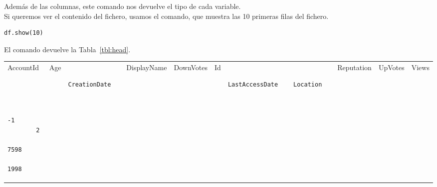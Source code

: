 \documentclass[12pt,a4paper,twoside,openright,titlepage,final]{article}
\begin{document}
Además de las columnas, este comando nos devuelve el tipo de cada variable.\\

Si queremos ver el contenido del fichero, usamos el comando, que muestra las 10 primeras filas del fichero.

\begin{verbatim}
df.show(10)
\end{verbatim}

El comando devuelve la Tabla~\ref{tbl:head}.\\

\begin{longtable}[]{@{}lllllllllll@{}}
	\toprule
	\begin{minipage}[t]{0.05\columnwidth}\raggedright\strut
		AccountId
		\strut\end{minipage} &
	\begin{minipage}[t]{0.03\columnwidth}\raggedright\strut
		Age
		\strut\end{minipage} &
	\begin{minipage}[t]{0.11\columnwidth}\raggedright\strut
		\begin{verbatim}
		CreationDate
		\end{verbatim}
		\strut\end{minipage} &
	\begin{minipage}[t]{0.08\columnwidth}\raggedright\strut
		DisplayName
		\strut\end{minipage} &
	\begin{minipage}[t]{0.05\columnwidth}\raggedright\strut
		DownVotes
		\strut\end{minipage} &
	\begin{minipage}[t]{0.02\columnwidth}\raggedright\strut
		Id
		\strut\end{minipage} &
	\begin{minipage}[t]{0.11\columnwidth}\raggedright\strut
		\begin{verbatim}
		LastAccessDate
		\end{verbatim}
		\strut\end{minipage} &
	\begin{minipage}[t]{0.11\columnwidth}\raggedright\strut
		\begin{verbatim}
		Location
		\end{verbatim}
		\strut\end{minipage} &
	\begin{minipage}[t]{0.06\columnwidth}\raggedright\strut
		Reputation
		\strut\end{minipage} &
	\begin{minipage}[t]{0.04\columnwidth}\raggedright\strut
		UpVotes
		\strut\end{minipage} &
	\begin{minipage}[t]{0.04\columnwidth}\raggedright\strut
		Views
		\strut\end{minipage}\tabularnewline
	\begin{minipage}[t]{0.05\columnwidth}\raggedright\strut
		\begin{verbatim}
		-1
		2
		7598
		1998
		\end{verbatim}
		

\end{minipage}
\end{longtable}
\end{document}
